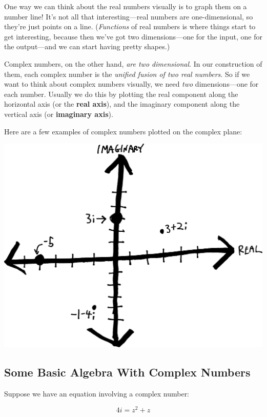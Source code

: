 \documentclass[
]{article}
\begin{document}
One way we can think about the real numbers visually is to graph them on
a number line! It's not all that interesting---real numbers are
one-dimensional, so they're just points on a line. (\emph{Functions} of
real numbers is where things start to get interesting, because then
we've got two dimensions---one for the input, one for the output---and
we can start having pretty shapes.)

Complex numbers, on the other hand, \emph{are two dimensional}. In our
construction of them, each complex number is the \emph{unified fusion of
two real numbers}. So if we want to think about complex numbers
visually, we need \emph{two} dimensions---one for each number. Usually
we do this by plotting the real component along the horizontal axis (or
the \textbf{real axis}), and the imaginary component along the vertical
axis (or \textbf{imaginary axis}).

Here are a few examples of complex numbers plotted on the complex plane:

\includegraphics{complex-plane.png}

\hypertarget{some-basic-algebra-with-complex-numbers}{%
\subsection{Some Basic Algebra With Complex
Numbers}\label{some-basic-algebra-with-complex-numbers}}

Suppose we have an equation involving a complex number:

\[4i = z^2 + z\]
\end{document}
